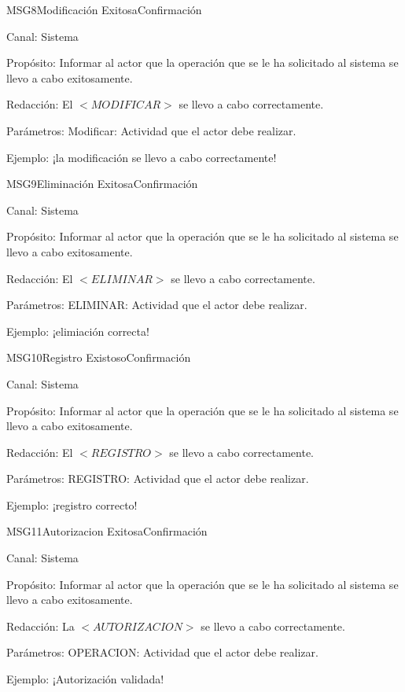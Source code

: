 \begin{mensaje}{MSG8}{Modificación Exitosa}{Confirmación \msgConfirm}
	\item[Canal:] Sistema
    \item[Propósito:] Informar al actor que la operación que se le ha solicitado al sistema se llevo a cabo exitosamente.
    \item[Redacción:] El $<MODIFICAR>$ se llevo a cabo correctamente.
    \item[Parámetros:] Modificar: Actividad que el actor debe realizar.
    \item[Ejemplo:] ¡la modificación se llevo a cabo correctamente!
\end{mensaje}
\begin{mensaje}{MSG9}{Eliminación Exitosa}{Confirmación \msgConfirm}
	\item[Canal:] Sistema
    \item[Propósito:] Informar al actor que la operación que se le ha solicitado al sistema se llevo a cabo exitosamente.
    \item[Redacción:] El $<ELIMINAR>$ se llevo a cabo correctamente.
    \item[Parámetros:] ELIMINAR: Actividad que el actor debe realizar.
    \item[Ejemplo:]¡elimiación correcta!
\end{mensaje}
\begin{mensaje}{MSG10}{Registro Existoso}{Confirmación \msgConfirm}
	\item[Canal:] Sistema
    \item[Propósito:] Informar al actor que la operación que se le ha solicitado al sistema se llevo a cabo exitosamente.
    \item[Redacción:] El $<REGISTRO>$ se llevo a cabo correctamente.
    \item[Parámetros:] REGISTRO: Actividad que el actor debe realizar.
    \item[Ejemplo:] ¡registro correcto!
\end{mensaje}
\begin{mensaje}{MSG11}{Autorizacion Exitosa}{Confirmación \msgConfirm}
	\item[Canal:] Sistema
    \item[Propósito:] Informar al actor que la operación que se le ha solicitado al sistema se llevo a cabo exitosamente.
    \item[Redacción:] La $<AUTORIZACION>$ se llevo a cabo correctamente.
    \item[Parámetros:] OPERACION: Actividad que el actor debe realizar.
    \item[Ejemplo:] ¡Autorización validada!
\end{mensaje}
